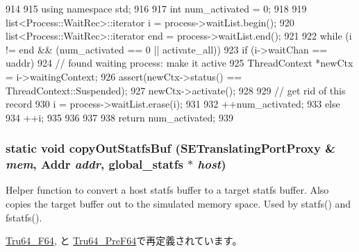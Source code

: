 \begin{DoxyCode}
914     {
915         using namespace std;
916 
917         int num_activated = 0;
918 
919         list<Process::WaitRec>::iterator i = process->waitList.begin();
920         list<Process::WaitRec>::iterator end = process->waitList.end();
921 
922         while (i != end && (num_activated == 0 || activate_all)) {
923             if (i->waitChan == uaddr) {
924                 // found waiting process: make it active
925                 ThreadContext *newCtx = i->waitingContext;
926                 assert(newCtx->status() == ThreadContext::Suspended);
927                 newCtx->activate();
928 
929                 // get rid of this record
930                 i = process->waitList.erase(i);
931 
932                 ++num_activated;
933             } else {
934                 ++i;
935             }
936         }
937 
938         return num_activated;
939     }
\end{DoxyCode}
\hypertarget{classTru64_ab39f4973592abe61638b8b998bc5691d}{
\subsubsection[{copyOutStatfsBuf}]{\setlength{\rightskip}{0pt plus 5cm}static void copyOutStatfsBuf ({\bf SETranslatingPortProxy} \& {\em mem}, \/  {\bf Addr} {\em addr}, \/  {\bf global\_\-statfs} $\ast$ {\em host})}}
\label{classTru64_ab39f4973592abe61638b8b998bc5691d}
Helper function to convert a host statfs buffer to a target statfs buffer. Also copies the target buffer out to the simulated memory space. Used by statfs() and fstatfs(). 

\hyperlink{classTru64__F64_ab39f4973592abe61638b8b998bc5691d}{Tru64\_\-F64}, と \hyperlink{classTru64__PreF64_ab39f4973592abe61638b8b998bc5691d}{Tru64\_\-PreF64}で再定義されています。


